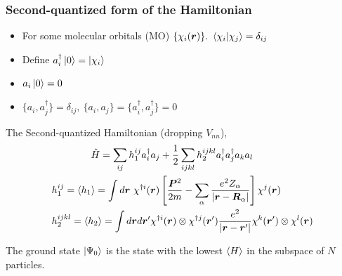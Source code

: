 \documentclass{beamer}
\renewcommand{\(}{\left(}
\renewcommand{\)}{\right)}
\renewcommand{\[}{\left[}
\renewcommand{\]}{\right]}
\begin{document}
\begin{frame}
    \frametitle{Second-quantized form of the Hamiltonian}
    \begin{itemize}
        \item For some molecular orbitals (MO) $\{\chi_i(\bm r)\}. \ \braket{\chi_i | \chi_j} = \delta_{ij}$ 
        \item Define $a^\dagger_i \ket{0} = \ket{\chi_i}$
        \item $a_i\ket{0} = 0$
        \item $\{a_i, a^\dagger_j\} = \delta_{ij}, \  \{a_i, a_j\} = \{a^\dagger_i, a^\dagger_j\} = 0$
    \end{itemize}
    \pause
    The Second-quantized Hamiltonian (dropping $V_{nn}$), 
    \begin{align*}
        &\quad \quad \quad \quad \hat{H} = \sum_{ij} h_1^{ij} a^\dagger_i a_j + \frac{1}{2} \sum_{ijkl} h_2^{ijkl} a^\dagger_i a^\dagger_j a_k a_l \\ 
        &h^{ij}_1 = \braket{h_1} = \int d\bm r \ \chi^{\dagger i}(\bm r) \[\frac{\bm P^2}{2m} - \sum_\alpha \frac{e^2 Z_\alpha}{|\bm r - \bm R_\alpha|} \] \chi^j(\bm r) \\ 
        & h^{ijkl}_2 = \braket{h_2} = \int d\bm r d\bm r^\prime \chi^{\dagger i}(\bm r) \otimes \chi^{\dagger j}(\bm r^\prime) \frac{e^2}{|\bm r - \bm r^\prime|} \chi^{k}(\bm r^\prime)\otimes \chi^{l}(\bm r)
    \end{align*}\pause
    \begin{framed}
        The ground state $\ket{\Psi_0}$ is the state with the lowest $\braket{H}$ in the subspace of $N$ particles.
    \end{framed}
\end{frame}
\end{document}
